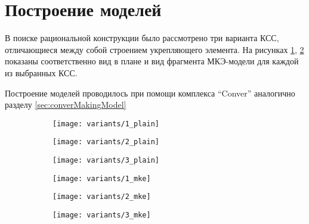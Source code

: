 \section{Построение моделей}

В поиске рациональной конструкции было рассмотрено три варианта КСС, отличающиеся между собой строением укрепляющего элемента. На рисунках \ref{fig:variants_plain}, \ref{fig:variants_mke} показаны соответственно вид в плане и вид фрагмента МКЭ-модели для каждой из выбранных КСС. 

Построение моделей проводилось при помощи комплекса ``Conver'' аналогично разделу \ref{sec:converMakingModel}

\begin{figure}[H]
\centering
\begin{subfigure}[b]{0.32\textwidth}
\centering
	\texttt{[image: variants/1\_plain]}
\end{subfigure}
\hspace{\fill}
\begin{subfigure}[b]{0.32\textwidth}
\centering
	\texttt{[image: variants/2\_plain]}
\end{subfigure}
\hspace{\fill}
\begin{subfigure}[b]{0.32\textwidth}
\centering
	\texttt{[image: variants/3\_plain]}
\end{subfigure}
\hspace{\fill}
\label{fig:variants_plain}
\end{figure}	


\begin{figure}[H]
\centering
\begin{subfigure}[b]{0.32\textwidth}
	\texttt{[image: variants/1\_mke]}
\end{subfigure}
\hspace{\fill}
\begin{subfigure}[b]{0.32\textwidth}
	\texttt{[image: variants/2\_mke]}
\end{subfigure}
\hspace{\fill}
\begin{subfigure}[b]{0.32\textwidth}
	\texttt{[image: variants/3\_mke]}
\end{subfigure}
\hspace{\fill}
\label{fig:variants_mke}
\end{figure}	